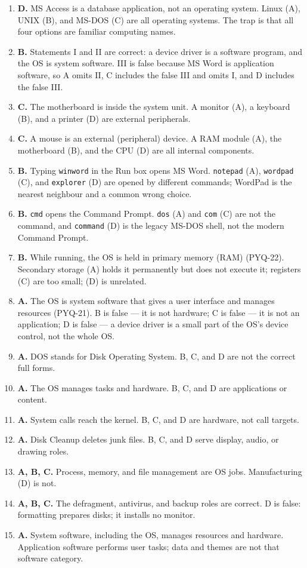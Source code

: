 \begin{enumerate}[label=\textbf{Q\arabic*.}, leftmargin=*]
  (C), and macOS (D) are operating systems but not Linux distributions.
\item \textbf{D.} MS Access is a database application, not an operating
  system. Linux (A), UNIX (B), and MS-DOS (C) are all operating systems. The
  trap is that all four options are familiar computing names.
\item \textbf{B.} Statements I and II are correct: a device driver is a
  software program, and the OS is system software. III is false because MS
  Word is application software, so A omits II, C includes the false III and
  omits I, and D includes the false III.
\item \textbf{C.} The motherboard is inside the system unit. A monitor (A),
  a keyboard (B), and a printer (D) are external peripherals.
\item \textbf{C.} A mouse is an external (peripheral) device. A RAM module
  (A), the motherboard (B), and the CPU (D) are all internal components.
\item \textbf{B.} Typing \texttt{winword} in the Run box opens MS Word.
  \texttt{notepad} (A), \texttt{wordpad} (C), and \texttt{explorer} (D) are
  opened by different commands; WordPad is the nearest neighbour and a common
  wrong choice.
\item \textbf{B.} \texttt{cmd} opens the Command Prompt. \texttt{dos} (A) and
  \texttt{com} (C) are not the command, and \texttt{command} (D) is the
  legacy MS-DOS shell, not the modern Command Prompt.
\item \textbf{B.} While running, the OS is held in primary memory (RAM)
  (PYQ-22). Secondary storage (A) holds it permanently but does not execute
  it; registers (C) are too small; (D) is unrelated.
\item \textbf{A.} The OS is system software that gives a user interface and
  manages resources (PYQ-21). B is false --- it is not hardware; C is false
  --- it is not an application; D is false --- a device driver is a small
  part of the OS's device control, not the whole OS.
\item \textbf{A.} DOS stands for Disk Operating System. B, C, and D are not
  the correct full forms.

\item \textbf{A.} The OS manages tasks and hardware. B, C, and D are applications or content.
\item \textbf{A.} System calls reach the kernel. B, C, and D are hardware, not call targets.
\item \textbf{A.} Disk Cleanup deletes junk files. B, C, and D serve display, audio, or drawing roles.
\item \textbf{A, B, C.} Process, memory, and file management are OS jobs. Manufacturing (D) is not.
\item \textbf{A, B, C.} The defragment, antivirus, and backup roles are correct. D is false: formatting prepares disks; it installs no monitor.
\item \textbf{A.} System software, including the OS, manages resources and hardware. Application software performs user tasks; data and themes are not that software category.


\end{enumerate}
